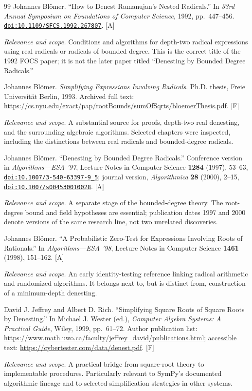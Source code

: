 \documentclass[11pt,letterpaper]{article}
\numberwithin{equation}{section}
\theoremstyle{definition}
\theoremstyle{remark}
\newcommand{\doi}[1]{\href{https://doi.org/#1}{\nolinkurl{doi:#1}}}
\newcommand{\status}[1]{\textsf{\small[#1]}}
\newcommand{\entrynote}[1]{\par\smallskip\noindent\emph{Relevance and scope.} #1}
\begin{document}
\begin{thebibliography}{99}
Johannes Bl\"omer. ``How to Denest Ramanujan's Nested Radicals.'' In \emph{33rd Annual Symposium on Foundations of Computer Science}, 1992, pp.~447--456. \doi{10.1109/SFCS.1992.267807}. \status{A}
\entrynote{Conditions and algorithms for depth-two radical expressions using real radicals or radicals of bounded degree. This is the correct title of the 1992 FOCS paper; it is not the later paper titled ``Denesting by Bounded Degree Radicals.''}

Johannes Bl\"omer. \emph{Simplifying Expressions Involving Radicals}. Ph.D. thesis, Freie Universit\"at Berlin, 1993. Archived full text: \url{https://cs.nyu.edu/exact/pap/rootBounds/sumOfSqrts/bloemerThesis.pdf}. \status{F}
\entrynote{A substantial source for proofs, depth-two real denesting, and the surrounding algebraic algorithms. Selected chapters were inspected, including the distinctions between real radicals and bounded-degree radicals.}

Johannes Bl\"omer. ``Denesting by Bounded Degree Radicals.'' Conference version in \emph{Algorithms---ESA '97}, Lecture Notes in Computer Science \textbf{1284} (1997), 53--63, \doi{10.1007/3-540-63397-9_5}; journal version, \emph{Algorithmica} \textbf{28} (2000), 2--15, \doi{10.1007/s004530010028}. \status{A}
\entrynote{A separate stage of the bounded-degree theory. The root-degree bound and field hypotheses are essential; publication dates 1997 and 2000 denote versions of the same research line, not two unrelated discoveries.}

Johannes Bl\"omer. ``A Probabilistic Zero-Test for Expressions Involving Roots of Rationals.'' In \emph{Algorithms---ESA '98}, Lecture Notes in Computer Science \textbf{1461} (1998), 151--162. \status{A}
\entrynote{An early identity-testing reference linking radical arithmetic and randomized algorithms. It belongs next to, but is distinct from, construction of a minimum-depth denesting.}

David J. Jeffrey and Albert D. Rich. ``Simplifying Square Roots of Square Roots by Denesting.'' In Michael J. Wester (ed.), \emph{Computer Algebra Systems: A Practical Guide}, Wiley, 1999, pp.~61--72. Author publication list: \url{https://www.math.uwo.ca/faculty/jeffrey_david/publications.html}; accessible text: \url{https://cybertester.com/data/denest.pdf}. \status{F}
\entrynote{A practical bridge from square-root theory to implementable procedures. Particularly relevant to SymPy's documented algorithmic lineage and to selected simplification strategies in other systems.}


\end{thebibliography}
\end{document}
